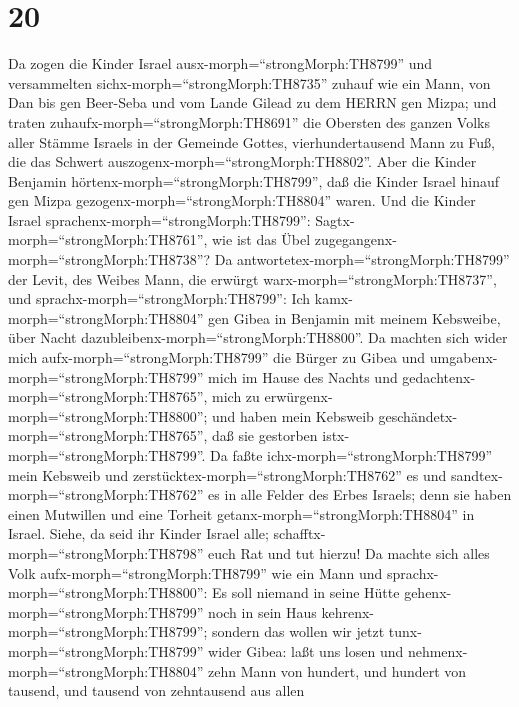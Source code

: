 \hypertarget{section-19}{%
\section{20}\label{section-19}}

 Da zogen die Kinder Israel
ausx-morph=``strongMorph:TH8799'' und versammelten
sichx-morph=``strongMorph:TH8735'' zuhauf wie ein Mann, von Dan bis gen
Beer-Seba und vom Lande Gilead zu dem HERRN gen Mizpa;  und
traten zuhaufx-morph=``strongMorph:TH8691'' die Obersten des ganzen
Volks aller Stämme Israels in der Gemeinde Gottes, vierhundertausend
Mann zu Fuß, die das Schwert auszogenx-morph=``strongMorph:TH8802''.
 Aber die Kinder Benjamin
hörtenx-morph=``strongMorph:TH8799'', daß die Kinder Israel hinauf gen
Mizpa gezogenx-morph=``strongMorph:TH8804'' waren. Und die Kinder Israel
sprachenx-morph=``strongMorph:TH8799'':
Sagtx-morph=``strongMorph:TH8761'', wie ist das Übel
zugegangenx-morph=``strongMorph:TH8738''?  Da
antwortetex-morph=``strongMorph:TH8799'' der Levit, des Weibes Mann, die
erwürgt warx-morph=``strongMorph:TH8737'', und
sprachx-morph=``strongMorph:TH8799'': Ich
kamx-morph=``strongMorph:TH8804'' gen Gibea in Benjamin mit meinem
Kebsweibe, über Nacht dazubleibenx-morph=``strongMorph:TH8800''.
 Da machten sich wider mich
aufx-morph=``strongMorph:TH8799'' die Bürger zu Gibea und
umgabenx-morph=``strongMorph:TH8799'' mich im Hause des Nachts und
gedachtenx-morph=``strongMorph:TH8765'', mich zu
erwürgenx-morph=``strongMorph:TH8800''; und haben mein Kebsweib
geschändetx-morph=``strongMorph:TH8765'', daß sie gestorben
istx-morph=``strongMorph:TH8799''.  Da faßte
ichx-morph=``strongMorph:TH8799'' mein Kebsweib und
zerstücktex-morph=``strongMorph:TH8762'' es und
sandtex-morph=``strongMorph:TH8762'' es in alle Felder des Erbes
Israels; denn sie haben einen Mutwillen und eine Torheit
getanx-morph=``strongMorph:TH8804'' in Israel.  Siehe, da
seid ihr Kinder Israel alle; schafftx-morph=``strongMorph:TH8798'' euch
Rat und tut hierzu!  Da machte sich alles Volk
aufx-morph=``strongMorph:TH8799'' wie ein Mann und
sprachx-morph=``strongMorph:TH8800'': Es soll niemand in seine Hütte
gehenx-morph=``strongMorph:TH8799'' noch in sein Haus
kehrenx-morph=``strongMorph:TH8799'';  sondern das wollen
wir jetzt tunx-morph=``strongMorph:TH8799'' wider Gibea: 
laßt uns losen und nehmenx-morph=``strongMorph:TH8804'' zehn Mann von
hundert, und hundert von tausend, und tausend von zehntausend aus allen
